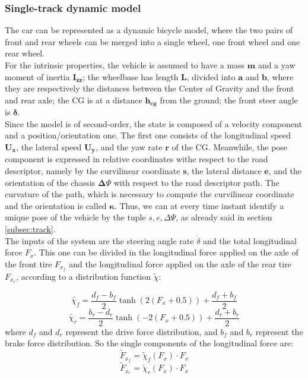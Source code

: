 \documentclass[a4paper, onecolumn, 12pt]{article}
\begin{document}
\subsubsection{Single-track dynamic model}
The car can be represented as a dynamic bicycle model, where the two pairs of
front and rear wheels can be merged into a single wheel, one front wheel and one
rear wheel.\\
For the intrinsic properties, the vehicle is assumed to have a mass $\mathbf{m}$
and a yaw moment of inertia $\mathbf{I_{zz}}$; the wheelbase has length
$\mathbf{L}$, divided into $\mathbf{a}$ and $\mathbf{b}$, where they are
respectively the distances between the Center of Gravity and the front and rear
axle; the CG is at a distance $\mathbf{h_{cg}}$ from the ground; the front steer
angle is $\mathbf{\delta}$.\\
Since the model is of second-order, the state is composed of a velocity
component and a position/orientation one. The first one consists of the
longitudinal speed $\mathbf{U_x}$, the lateral speed $\mathbf{U_y}$, and the yaw
rate $\mathbf{r}$ of the CG. Meanwhile, the pose component is expressed in
relative coordinates withe respect to the road descriptor, namely by the
curvilinear coordinate $\mathbf{s}$, the lateral distance $\mathbf{e}$, and the
orientation of the chassis $\mathbf{\Delta \varPsi}$ with respect to the road
descriptor path. The curvature of the path, which is necessary to compute the
curvilinear coordinate and the orientation is called $\mathbf{\kappa}$. Thus, we
can at every time instant identify a unique pose of the vehicle by the tuple
$s,e,\Delta \varPsi$, as already said in section \ref*{subsec:track}.\\
The inputs of the system are the steering angle rate $\dot{\delta}$ and the
total longitudinal force $F_x$. This one can be divided in the longitudinal
force applied on the axle of the front tire $F_{x_f}$ and the longitudinal force
applied on the axle of the rear tire $F_{x_r}$, according to a distribution
function $\tilde{\chi}$:

\begin{equation}
    \tilde{\chi_f} = \frac{d_f - b_f}{2}\tanh(2(F_x+0.5))+\frac{d_f+b_f}{2}
\end{equation}
\begin{equation}
    \tilde{\chi_r} = \frac{b_r-d_r}{2}\tanh(-2(F_x+0.5))+\frac{d_r+b_r}{2}
\end{equation}
where $d_f$ and $d_r$ represent the drive force distribution, and $b_f$ and $b_r$ represent the 
brake force distribution. So the single components of the longitudinal force are:
\begin{equation}
    \tilde{F}_{x_f} = \tilde{\chi}_f(F_x) \cdot F_x
\end{equation}
\begin{equation}
    \tilde{F}_{x_r} = \tilde{\chi}_r(F_x) \cdot F_x
\end{equation}
\end{document}
